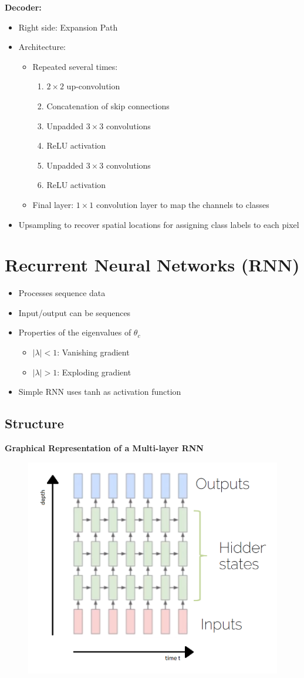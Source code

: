 \documentclass[10pt,a4paper]{article}
\newcommand{\props}{$\circ$}
\newcommand{\iprops}{\item[\props]}
\begin{document}
\textbf{Decoder:}
\begin{itemize}
	\item Right side: Expansion Path
	\item Architecture:
	\begin{itemize}
		\item Repeated several times:
		\begin{enumerate}
			\item $2 \times 2$ up-convolution
			\item Concatenation of skip connections
			\item Unpadded $3 \times 3$ convolutions
			\item ReLU activation
			\item Unpadded $3 \times 3$ convolutions
			\item ReLU activation
		\end{enumerate}
		\item Final layer: $1 \times 1$ convolution layer to map the channels to classes		
	\end{itemize}
	\iprops Upsampling to recover spatial locations for assigning class labels to each pixel
\end{itemize}
	
\pagebreak
\section{Recurrent Neural Networks (RNN)}
\begin{itemize}
	\item Processes sequence data
	\item Input/output can be sequences
	\iprops Properties of the eigenvalues of $\theta_c$
	\begin{itemize}
		\item $|\lambda| < 1$: Vanishing gradient
		\item $|\lambda| > 1$: Exploding gradient
	\end{itemize}
	\iprops Simple RNN uses tanh as activation function
\end{itemize}

\subsection{Structure}
\textbf{Graphical Representation of a Multi-layer RNN}
\begin{figure}[H]
	\includegraphics[width=0.7\columnwidth]{figures/rnn.png}
\end{figure}
\end{document}
